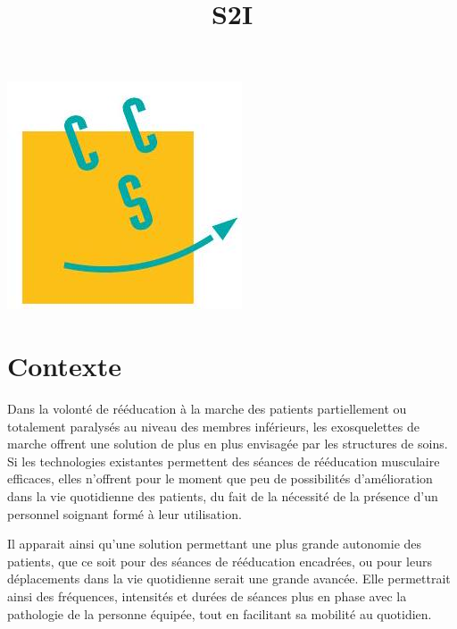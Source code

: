 \documentclass[10pt]{article}
\title{S2I }
\author{}
\date{}
\begin{document}
\maketitle
\begin{center}
\includegraphics[max width=\textwidth]{2023_05_12_54c6a64d2ffce28d5c72g-01}
\end{center}

\section{Contexte}
Dans la volonté de rééducation à la marche des patients partiellement ou totalement paralysés au niveau des membres inférieurs, les exosquelettes de marche offrent une solution de plus en plus envisagée par les structures de soins. Si les technologies existantes permettent des séances de rééducation musculaire efficaces, elles n'offrent pour le moment que peu de possibilités d'amélioration dans la vie quotidienne des patients, du fait de la nécessité de la présence d'un personnel soignant formé à leur utilisation.

Il apparait ainsi qu'une solution permettant une plus grande autonomie des patients, que ce soit pour des séances de rééducation encadrées, ou pour leurs déplacements dans la vie quotidienne serait une grande avancée. Elle permettrait ainsi des fréquences, intensités et durées de séances plus en phase avec la pathologie de la personne équipée, tout en facilitant sa mobilité au quotidien.
\end{document}
